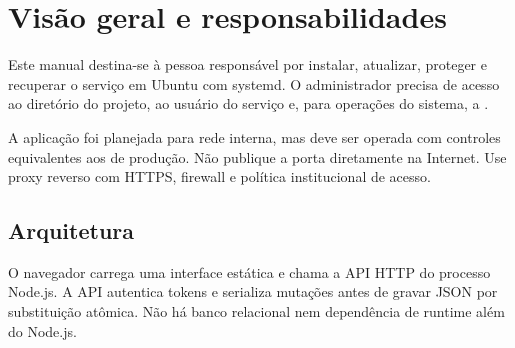 \chapter{Visão geral e responsabilidades}

Este manual destina-se à pessoa responsável por instalar, atualizar, proteger e recuperar o serviço em Ubuntu com systemd. O administrador precisa de acesso ao diretório do projeto, ao usuário do serviço e, para operações do sistema, a .

\begin{noticebox}
A aplicação foi planejada para rede interna, mas deve ser operada com controles equivalentes aos de produção. Não publique a porta diretamente na Internet. Use proxy reverso com HTTPS, firewall e política institucional de acesso.
\end{noticebox}

\section{Arquitetura}

O navegador carrega uma interface estática e chama a API HTTP do processo Node.js. A API autentica tokens e serializa mutações antes de gravar JSON por substituição atômica. Não há banco relacional nem dependência de runtime além do Node.js.

